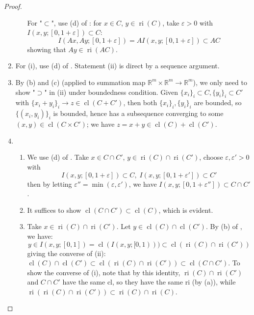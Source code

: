 \begin{proof}
\begin{enumerate}[label=(\alph*)]
\begin{itemize}
\[			            \]
			            For "$\subset$", use (d) of : for $x\in C$, $y\in \operatorname{ri}(C)$, take $\varepsilon >0$ with $I(x,y;[0,1+\varepsilon ])\subset C$:
			            \[
				            I(Ax,Ay;[0,1+\varepsilon ])=AI(x,y;[0,1+\varepsilon ])\subset AC
			            \]
			            showing that $Ay\in \operatorname{ri}(AC)$.
		      \end{itemize}
		\item For (i), use (d) of . Statement (ii) is direct by a sequence argument.
		\item By (b) and (c) (applied to summation map $\mathbb{R}^{m}\times\mathbb{R}^{m}\to \mathbb{R}^m$), we only need to show "$\supset$" in (ii) under boundedness condition. Given $\{x_i\}_i\subset C,\{y_i\}_i\subset C'$ with $\{x_i+y_i\}_i\to z\in \operatorname{cl}(C+C')$, then both $\{x_i\}_i,\{y_i\}_i$ are bounded, so $\{(x_i,y_i)\}_i$ is bounded, hence has a subsequence converging to some $(x,y)\in \operatorname{cl}(C\times C')$; we have $z=x+y\in \operatorname{cl}(C)+\operatorname{cl}(C')$.
		\item \begin{enumerate}[label=(\roman*)]
			      \item We use (d) of . Take $x\in C\cap C'$, $y\in \operatorname{ri}(C)\cap \operatorname{ri}(C')$, choose $\varepsilon,\varepsilon'>0$ with
			            \[
				            I(x,y;[0,1+\varepsilon ])\subset C,\;
				            I(x,y;[0,1+\varepsilon' ])\subset C'
			            \]
			            then by letting $\varepsilon''=\min(\varepsilon ,\varepsilon')$, we have $I(x,y;[0,1+\varepsilon'' ])\subset C\cap C'$.
			      \item It suffices to show $\operatorname{cl}(C\cap C')\subset \operatorname{cl}(C)$, which is evident.
			      \item Take $x\in \operatorname{ri}(C) \cap\operatorname{ri}(C')$. Let $y\in \operatorname{cl}(C)\cap \operatorname{cl}(C')$. By (b) of , we have:
			            \[
				            y\in I(x, y;[0, 1])=\operatorname{cl}(I(x, y;[0, 1)))\subset\operatorname{cl}(\operatorname{ri}(C)\cap \operatorname{ri}(C'))
			            \]
			            giving the converse of (ii): $\operatorname{cl}(C)\cap \operatorname{cl}(C')\subset \operatorname{cl}(\operatorname{ri}(C)\cap \operatorname{ri}(C'))\subset \operatorname{cl}(C\cap C')$. To show the converse of (i), note that by this identity, $\operatorname{ri}(C)\cap \operatorname{ri}(C')$ and $C\cap C'$ have the same cl, so they have the same ri (by (a)), while $\operatorname{ri}(\operatorname{ri}(C)\cap \operatorname{ri}(C'))\subset\operatorname{ri}(C)\cap \operatorname{ri}(C)$.

\end{enumerate}
\end{enumerate}
\end{proof}
